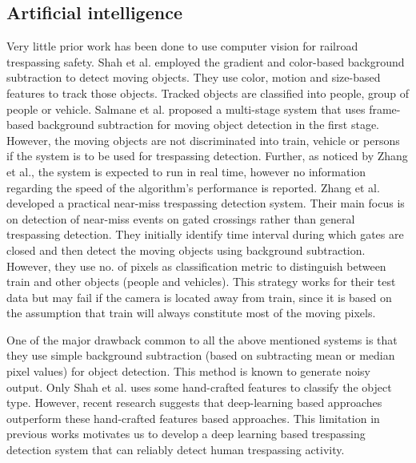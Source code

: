 \subsection{Artificial intelligence} Very little prior work has been done to use computer vision for railroad trespassing safety. Shah et al.\cite{shah2007automated} employed the gradient and color-based background subtraction to detect moving objects. They use color, motion and size-based features to track those objects. Tracked objects are classified into people, group of people or vehicle. Salmane et al.\cite{salmane2015video} proposed a multi-stage system that uses frame-based background subtraction for moving object detection in the first stage. However, the moving objects are not discriminated into train, vehicle or persons if the system is to be used for trespassing detection. Further, as noticed by Zhang et al.\cite{zhang2018automated}, the system is expected to run in real time, however no information regarding the
speed of the algorithm's performance is reported. Zhang et al.\cite{zhang2018automated} developed a practical near-miss trespassing detection system. Their main focus is on detection of near-miss events on gated crossings rather than general trespassing detection. They initially identify time interval during which gates are closed and then detect the moving objects using background subtraction. However, they use no. of pixels as classification metric to distinguish between train and other objects (people and vehicles). This strategy works for their test data but may fail if the camera is located away from train, since it is based on the assumption that train will always constitute most of the moving pixels. 

One of the major drawback common to all the above mentioned systems is that they use simple background subtraction (based on subtracting mean or median pixel values) for object detection. This method is known to generate noisy output\cite{stauffer1999adaptive}. Only Shah et al.\cite{shah2007automated} uses some hand-crafted features to classify the object type. However, recent research suggests that deep-learning based approaches outperform these hand-crafted features based approaches\cite{benenson2014ten}. This limitation in previous works motivates us to develop a deep learning based trespassing detection system that can reliably detect human trespassing activity. 

